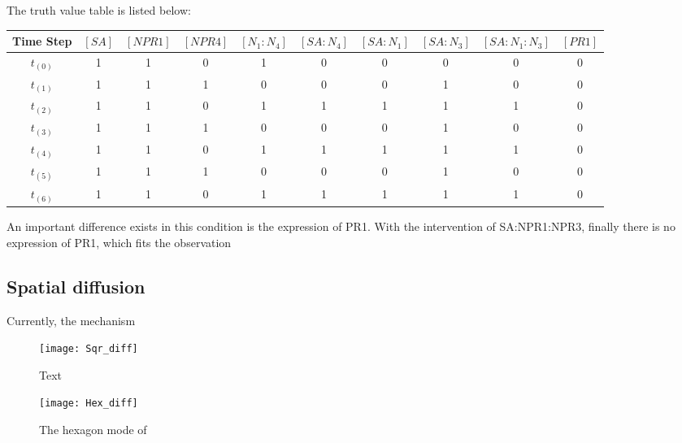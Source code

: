 The truth value table is listed below: \\
\begin{tabular}{c c c c c c c c c c}
	\hline
	\scriptsize\textsf{\textbf{Time Step}} & \scriptsize$[SA]$ & \scriptsize$[NPR1]$ & \scriptsize$[NPR4]$ &\scriptsize$[N_1:N_4]$ & \scriptsize$[SA:N_4]$ & \scriptsize$[SA:N_1]$ & \scriptsize$[SA:N_3]$ & \scriptsize$[SA:N_1:N_3]$ & \scriptsize$[PR1]$ \\
	\hline
	$t_{(0)}$ & 1 & 1 & 0 & 1 & 0 & 0 & 0 & 0 & 0 \\
	$t_{(1)}$ & 1 & 1 & 1 & 0 & 0 & 0 & 1 & 0 & 0 \\
	$t_{(2)}$ & 1 & 1 & 0 & 1 & 1 & 1 & 1 & 1 & 0 \\
	$t_{(3)}$ & 1 & 1 & 1 & 0 & 0 & 0 & 1 & 0 & 0 \\
	$t_{(4)}$ & 1 & 1 & 0 & 1 & 1 & 1 & 1 & 1 & 0 \\
	$t_{(5)}$ & 1 & 1 & 1 & 0 & 0 & 0 & 1 & 0 & 0 \\
	$t_{(6)}$ & 1 & 1 & 0 & 1 & 1 & 1 & 1 & 1 & 0 \\
	\hline
\end{tabular}
\linebreak
An important difference exists in this condition is the expression of PR1. With the intervention of SA:NPR1:NPR3, finally there is no expression of PR1, which fits the observation 
\clearpage
\subsection{Spatial diffusion}
Currently, the mechanism 
\begin{figure}[h]
	\centering
	\texttt{[image: Sqr\_diff]}
	\caption{Text}
\end{figure}
\begin{figure}[h]
	\centering
	\texttt{[image: Hex\_diff]}
	\caption{The hexagon mode of }
\end{figure}
\clearpage
